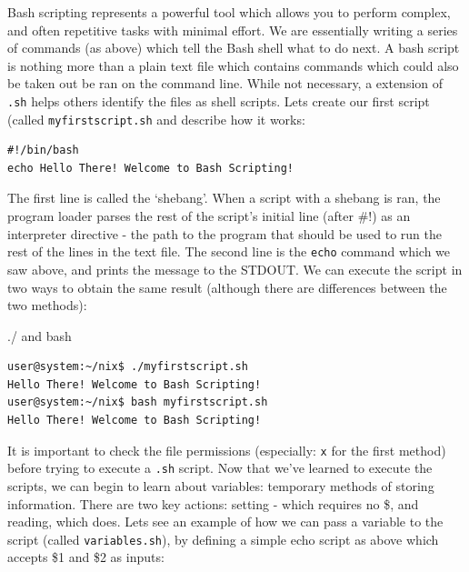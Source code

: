 \documentclass[11pt]{article}
\begin{document}
Bash scripting represents a powerful tool which allows you to perform complex, and often repetitive tasks with minimal effort. We are essentially writing a series of commands (as above) which tell the Bash shell what to do next. A bash script is nothing more than a plain text file which contains commands which could also be taken out be ran on the command line. While not necessary, a extension of \texttt{.sh} helps others identify the files as shell scripts. Lets create our first script (called \texttt{myfirstscript.sh} and describe how it works:\\

\begin{listing}[H]
\begin{verbatim}
#!/bin/bash
echo Hello There! Welcome to Bash Scripting!
\end{verbatim}
\end{listing}

The first line is called the `shebang'. When a script with a shebang is ran, the program loader parses the rest of the script's initial line (after \#!) as an interpreter directive - the path to the program that should be used to run the rest of the lines in the text file. The second line is the \texttt{echo} command which we saw above, and prints the message to the STDOUT. We can execute the script in two ways to obtain the same result (although there are differences between the two methods):\\

\begin{listing}[H]
\caption{./ and bash}\vspace{-0.1in}
\begin{verbatim}
user@system:~/nix$ ./myfirstscript.sh
Hello There! Welcome to Bash Scripting!
user@system:~/nix$ bash myfirstscript.sh
Hello There! Welcome to Bash Scripting!
\end{verbatim}
\end{listing}

It is important to check the file permissions (especially: \texttt{x} for the first method) before trying to execute a \texttt{.sh} script. Now that we've learned to execute the scripts, we can begin to learn about variables: temporary methods of storing information. There are two key actions: setting - which requires no \$, and reading, which does. Lets see an example of how we can pass a variable to the script (called \texttt{variables.sh}), by defining a simple echo script as above which accepts \$1 and \$2 as inputs:\\
\end{document}
